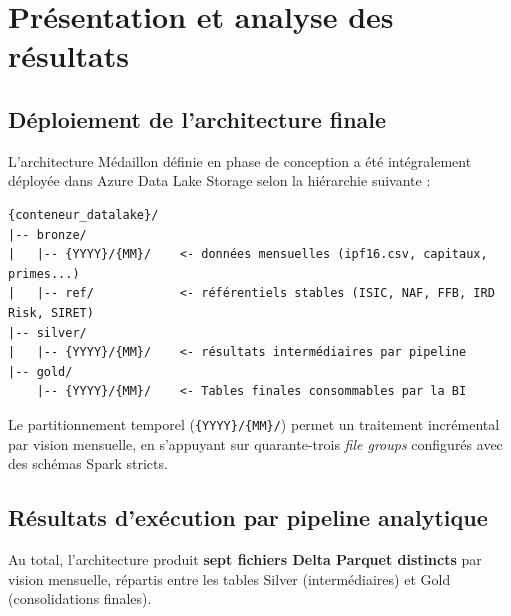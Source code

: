 \chapter{Présentation et analyse des résultats}

\section{Déploiement de l'architecture finale}

L'architecture Médaillon définie en phase de conception a été intégralement
déployée dans Azure Data Lake Storage selon la hiérarchie suivante :

\begin{verbatim}
{conteneur_datalake}/
|-- bronze/
|   |-- {YYYY}/{MM}/    <- données mensuelles (ipf16.csv, capitaux, primes...)
|   |-- ref/            <- référentiels stables (ISIC, NAF, FFB, IRD Risk, SIRET)
|-- silver/
|   |-- {YYYY}/{MM}/    <- résultats intermédiaires par pipeline
|-- gold/
    |-- {YYYY}/{MM}/    <- Tables finales consommables par la BI
\end{verbatim}

Le partitionnement temporel (\texttt{\{YYYY\}/\{MM\}/}) permet un traitement
incrémental par vision mensuelle, en s'appuyant sur quarante-trois
\textit{file groups} configurés avec des schémas Spark stricts.

\section{Résultats d'exécution par pipeline analytique}

Au total, l'architecture produit \textbf{sept fichiers Delta Parquet distincts} par
vision mensuelle, répartis entre les tables Silver (intermédiaires) et Gold
(consolidations finales).

